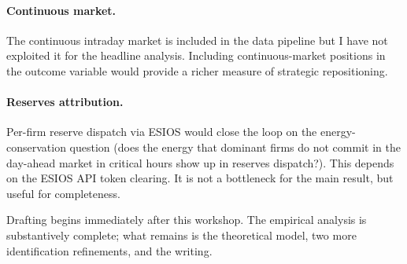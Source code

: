 \documentclass[11pt,a4paper]{article}
\begin{document}
\paragraph{Continuous market.} The continuous intraday market is included in the data pipeline but I have not exploited it for the headline analysis. Including continuous-market positions in the outcome variable would provide a richer measure of strategic repositioning.

\paragraph{Reserves attribution.} Per-firm reserve dispatch via ESIOS would close the loop on the energy-conservation question (does the energy that dominant firms do not commit in the day-ahead market in critical hours show up in reserves dispatch?). This depends on the ESIOS API token clearing. It is not a bottleneck for the main result, but useful for completeness.

Drafting begins immediately after this workshop. The empirical analysis is substantively complete; what remains is the theoretical model, two more identification refinements, and the writing.

\bigskip
\end{document}
